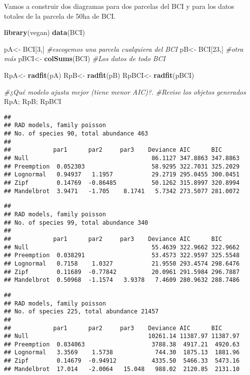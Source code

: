 \documentclass[]{book}
\newenvironment{Shaded}{\begin{snugshade}}{\end{snugshade}}
\newcommand{\KeywordTok}[1]{\textcolor[rgb]{0.13,0.29,0.53}{\textbf{{#1}}}}
\newcommand{\DecValTok}[1]{\textcolor[rgb]{0.00,0.00,0.81}{{#1}}}
\newcommand{\StringTok}[1]{\textcolor[rgb]{0.31,0.60,0.02}{{#1}}}
\newcommand{\CommentTok}[1]{\textcolor[rgb]{0.56,0.35,0.01}{\textit{{#1}}}}
\newcommand{\NormalTok}[1]{{#1}}
\begin{document}
Vamos a construir dos diagramas para dos parcelas del BCI y para los
datos totales de la parcela de 50ha de BCI.

\begin{Shaded}
\begin{Highlighting}[]
\KeywordTok{library}\NormalTok{(vegan)}
\KeywordTok{data}\NormalTok{(BCI)}

\NormalTok{pA<-}\StringTok{ }\NormalTok{BCI[}\DecValTok{3}\NormalTok{,] }\CommentTok{#escogemos una parcela cualquiera del BCI}
\NormalTok{pB<-}\StringTok{ }\NormalTok{BCI[}\DecValTok{23}\NormalTok{,] }\CommentTok{#otra más}
\NormalTok{pBCI<-}\StringTok{ }\KeywordTok{colSums}\NormalTok{(BCI) }\CommentTok{#Los datos de todo BCI}

\NormalTok{RpA<-}\StringTok{ }\KeywordTok{radfit}\NormalTok{(pA)}
\NormalTok{RpB<-}\StringTok{ }\KeywordTok{radfit}\NormalTok{(pB)}
\NormalTok{RpBCI<-}\StringTok{ }\KeywordTok{radfit}\NormalTok{(pBCI)}

\CommentTok{#¿Qué modelo ajusta mejor (tiene menor AIC)?. }
\CommentTok{#Revise los objetos generados }
\NormalTok{RpA; RpB; RpBCI}
\end{Highlighting}
\end{Shaded}

\begin{verbatim}
## 
## RAD models, family poisson 
## No. of species 90, total abundance 463
## 
##            par1      par2     par3    Deviance AIC      BIC     
## Null                                   86.1127 347.8863 347.8863
## Preemption  0.052303                   58.9295 322.7031 325.2029
## Lognormal   0.94937   1.1957           29.2719 295.0455 300.0451
## Zipf        0.14769  -0.86485          50.1262 315.8997 320.8994
## Mandelbrot  3.9471   -1.705    8.1741   5.7342 273.5077 281.0072
\end{verbatim}

\begin{verbatim}
## 
## RAD models, family poisson 
## No. of species 99, total abundance 340
## 
##            par1      par2     par3    Deviance AIC      BIC     
## Null                                   55.4639 322.9662 322.9662
## Preemption  0.038291                   53.4573 322.9597 325.5548
## Lognormal   0.7158    1.0327           21.9550 293.4574 298.6476
## Zipf        0.11689  -0.77842          20.0961 291.5984 296.7887
## Mandelbrot  0.50968  -1.1574   3.9378   7.4609 280.9632 288.7486
\end{verbatim}

\begin{verbatim}
## 
## RAD models, family poisson 
## No. of species 225, total abundance 21457
## 
##            par1      par2     par3    Deviance AIC      BIC     
## Null                                  10261.14 11387.97 11387.97
## Preemption  0.034063                   3788.38  4917.21  4920.63
## Lognormal   3.3569    1.5738            744.30  1875.13  1881.96
## Zipf        0.14679  -0.94912          4335.50  5466.33  5473.16
## Mandelbrot  17.014   -2.0064   15.048   988.02  2120.85  2131.10
\end{verbatim}
\end{document}
